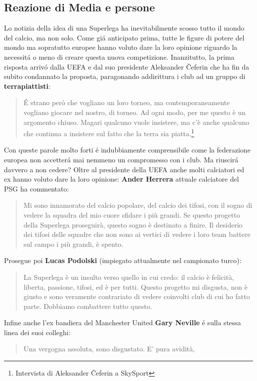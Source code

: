 \documentclass[
    corpo=12pt,
    oneside,
    evenboxes,
    tipotesi=triennale,
    stile=classica,
    oldstyle,
    autoretitolo,
    greek,
]{toptesi}
\begin{document}
\begin{interlinea}{1.5}
\section{Reazione di Media e persone}
Lo notizia della idea di una Superlega ha inevitabilmente scosso tutto il mondo del calcio, ma non solo. Come gi\'a anticipato prima,
tutte le figure di potere del mondo ma sopratutto europee hanno voluto dare la loro opinione riguardo la necessit\'a o meno di creare questa nuova competizione.
Inanzitutto, la prima risposta arriv\'o dalla UEFA e dal suo presidente Aleksander Čeferin che ha fin da subito condannato la proposta, paragonando
addirittura i club ad un gruppo di \textbf{terrapiattisti}: \begin{quote}\small \'E strano però che vogliano un loro torneo, ma contemporaneamente vogliano giocare nel nostro, 
di torneo. Ad ogni modo, per me questo è un argomento chiuso. Magari qualcuno vuole insistere, ma c’è anche qualcuno che continua a insistere sul fatto 
che la terra sia piatta.\footnote{Intervista di Aleksander Čeferin a SkySport}\end{quote} Con queste parole molto forti \'e indubbiamente comprensibile come la federazione europea non accetter\'a mai 
nemmeno un compromesso con i club. Ma riuscir\'a davvero a non cedere?\newline
Oltre al presidente della UEFA anche molti calciatori ed ex hanno voluto dare la loro opinione: \textbf{Ander Herrera} attuale calciatore del PSG ha commentato: 
\begin{quote}\small Mi sono innamorato del calcio popolare, del calcio dei tifosi, con il sogno di vedere la squadra del mio cuore sfidare i più grandi. Se questo progetto 
della Superlega proseguirà, questo sogno è destinato a finire. Il desiderio dei tifosi delle squadre che non sono ai vertici di vedere i loro team battere 
sul campo i più grandi, è spento.\end{quote} Prosegue poi \textbf{Lucas Podolski} (impiegato attualmente nel campionato turco): \begin{quote}\small La Superlega è un insulto verso quello 
in cui credo: il calcio è felicità, liberta, passione, tifosi, ed è per tutti. Questo progetto mi disgusta, non è giusto e sono veramente contrariato di vedere coinvolti 
club di cui ho fatto parte. Dobbiamo combattere tutto questo.\end{quote}
Infine anche l'ex bandiera del Manchester United \textbf{Gary Neville} \'e sulla stessa linea dei suoi colleghi: \begin{quote}\small Una vergogna assoluta, sono disgustato. E' pura avidità,

\end{quote}
\end{interlinea}
\end{document}
